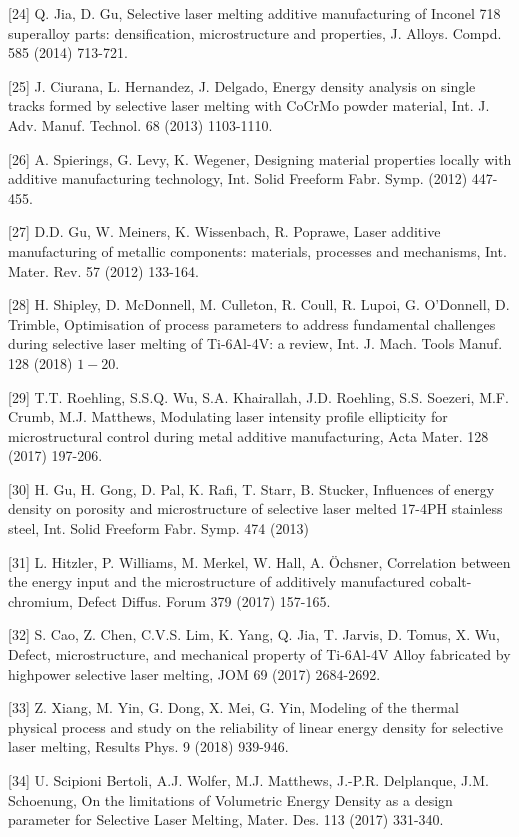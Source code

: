 \documentclass[10pt]{article}
\begin{document}
[24] Q. Jia, D. Gu, Selective laser melting additive manufacturing of Inconel 718 superalloy parts: densification, microstructure and properties, J. Alloys. Compd. 585 (2014) 713-721.

[25] J. Ciurana, L. Hernandez, J. Delgado, Energy density analysis on single tracks formed by selective laser melting with CoCrMo powder material, Int. J. Adv. Manuf. Technol. 68 (2013) 1103-1110.

[26] A. Spierings, G. Levy, K. Wegener, Designing material properties locally with additive manufacturing technology, Int. Solid Freeform Fabr. Symp. (2012) 447-455.

[27] D.D. Gu, W. Meiners, K. Wissenbach, R. Poprawe, Laser additive manufacturing of metallic components: materials, processes and mechanisms, Int. Mater. Rev. 57 (2012) 133-164.

[28] H. Shipley, D. McDonnell, M. Culleton, R. Coull, R. Lupoi, G. O’Donnell, D. Trimble, Optimisation of process parameters to address fundamental challenges during selective laser melting of Ti-6Al-4V: a review, Int. J. Mach. Tools Manuf. 128 (2018) $1-20$.

[29] T.T. Roehling, S.S.Q. Wu, S.A. Khairallah, J.D. Roehling, S.S. Soezeri, M.F. Crumb, M.J. Matthews, Modulating laser intensity profile ellipticity for microstructural control during metal additive manufacturing, Acta Mater. 128 (2017) 197-206.

[30] H. Gu, H. Gong, D. Pal, K. Rafi, T. Starr, B. Stucker, Influences of energy density on porosity and microstructure of selective laser melted 17-4PH stainless steel, Int. Solid Freeform Fabr. Symp. 474 (2013)

[31] L. Hitzler, P. Williams, M. Merkel, W. Hall, A. Öchsner, Correlation between the energy input and the microstructure of additively manufactured cobalt-chromium, Defect Diffus. Forum 379 (2017) 157-165.

[32] S. Cao, Z. Chen, C.V.S. Lim, K. Yang, Q. Jia, T. Jarvis, D. Tomus, X. Wu, Defect, microstructure, and mechanical property of Ti-6Al-4V Alloy fabricated by highpower selective laser melting, JOM 69 (2017) 2684-2692.

[33] Z. Xiang, M. Yin, G. Dong, X. Mei, G. Yin, Modeling of the thermal physical process and study on the reliability of linear energy density for selective laser melting, Results Phys. 9 (2018) 939-946.

[34] U. Scipioni Bertoli, A.J. Wolfer, M.J. Matthews, J.-P.R. Delplanque, J.M. Schoenung, On the limitations of Volumetric Energy Density as a design parameter for Selective Laser Melting, Mater. Des. 113 (2017) 331-340.
\end{document}
